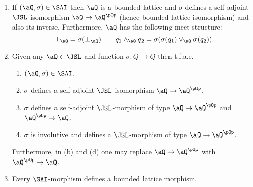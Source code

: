 \documentclass{article}
\begin{document}
\begin{lemma}
\label{lem:interpret_infinite_sai}
\item
\begin{enumerate}
\item
If $(\aQ,\sigma) \in \SAI$ then $\aQ$ is a bounded lattice and $\sigma$ defines a self-adjoint $\JSL$-isomorphism $\aQ \to \aQ^{\pOp}$ (hence bounded lattice isomorphism) and also its inverse. Furthermore, $\aQ$ has the following meet structure:
\[
\top_\aQ = \sigma(\bot_\aQ)
\qquad
q_1 \land_\aQ q_2 = \sigma(\sigma(q_1) \lor_\aQ \sigma(q_2)).
\]

\item
Given any $\aQ \in \JSL$ and function $\sigma : Q \to Q$ then t.f.a.e.\

\begin{enumerate}
\item
$(\aQ,\sigma) \in \SAI$.
\item
$\sigma$ defines a self-adjoint $\JSL$-isomorphism $\aQ \to \aQ^{\pOp}$.
\item
$\sigma$ defines a self-adjoint $\JSL$-morphism of type $\aQ \to \aQ^{\pOp}$ and $\aQ^{\pOp} \to \aQ$.
\item
$\sigma$ is involutive and defines a $\JSL$-morphism of type $\aQ \to \aQ^{\pOp}$.
\end{enumerate}

Furthermore, in (b) and (d) one may replace $\aQ \to \aQ^{\pOp}$ with $\aQ^{\pOp} \to \aQ$.

\item
Every $\SAI$-morphism defines a bounded lattice morphism.

\end{enumerate}
\end{lemma}
\end{document}
